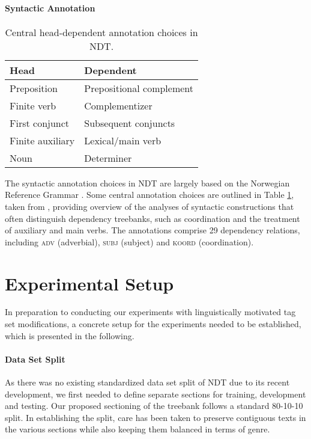 \documentclass[11pt,a4paper]{article}
\begin{document}
\paragraph{Syntactic Annotation}
\begin{table}
    \centering
    \smaller[0.5]
    \begin{tabular}{@{}ll@{}}
        \toprule
        \textbf{Head} & \textbf{Dependent} \\
        \midrule
        Preposition & Prepositional complement \\
        Finite verb & Complementizer \\
        First conjunct & Subsequent conjuncts \\
        Finite auxiliary & Lexical/main verb \\
        Noun & Determiner \\
        \bottomrule
    \end{tabular}
    \caption{Central head-dependent annotation choices in NDT.}
    \label{ndtannotation}
\end{table}

The syntactic annotation choices in NDT are largely based on the Norwegian
Reference Grammar \cite{Faa:Lie:Van:97}. Some central annotation choices are
outlined in Table \ref{ndtannotation}, taken from ,
providing overview of the analyses of syntactic constructions that often
distinguish dependency treebanks, such as coordination and the treatment of
auxiliary and main verbs. The annotations comprise 29 dependency relations,
including \textsc{adv} (adverbial), \textsc{subj} (subject) and \textsc{koord}
(coordination).

\section{Experimental Setup}
\label{sec:setup}
In preparation to conducting our experiments with linguistically motivated tag
set modifications, a concrete setup for the experiments needed to be
established, which is presented in the following.


\paragraph{Data Set Split}
As there was no existing standardized data set split of NDT due to its recent
development, we first needed to define separate sections for training,
development and testing. Our proposed sectioning of the treebank follows a
standard 80-10-10 split. In establishing the split, care has been taken to
preserve contiguous texts in the various sections while also keeping them
balanced in terms of genre.
\end{document}
